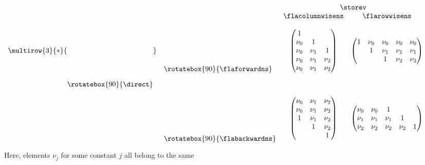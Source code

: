 \begin{flaspec}
{\begin{center}
\begin{math}
\begin{array}{clcc}
 & & \multicolumn{2}{c}{\storev}  \\
 & & \flacolumnwisens & \flarowwisens \\
& & & \\
\multirow{3}{*}{\raisebox{-16.5mm}{\rotatebox{90}{\direct}}}
&
\raisebox{-9.0mm}{\rotatebox{90}{\flaforwardns}}
& 
\begin{pmatrix}
1      &         &         \\
\nu_0  &  1      &         \\
\nu_0  &  \nu_1  &  1      \\
\nu_0  &  \nu_1  &  \nu_2  \\
\nu_0  &  \nu_1  &  \nu_2
\end{pmatrix}
&
\begin{pmatrix}
1    &  \nu_0  &  \nu_0  &  \nu_0  &  \nu_0  \\
     &  1      &  \nu_1  &  \nu_1  &  \nu_1  \\
     &         &  1      &  \nu_2  &  \nu_2
\end{pmatrix}
\\
 & & & \\
&
\raisebox{-10.0mm}{\rotatebox{90}{\flabackwardns}}
&
\begin{pmatrix}
\nu_0  &  \nu_1  &  \nu_2  \\
\nu_0  &  \nu_1  &  \nu_2  \\
1      &  \nu_1  &  \nu_2  \\
       &  1      &  \nu_2  \\
       &         &  1
\end{pmatrix}
&
\begin{pmatrix}
\nu_0  &  \nu_0  &  1      &         &     \\
\nu_1  &  \nu_1  &  \nu_1  &  1      &     \\
\nu_2  &  \nu_2  &  \nu_2  &  \nu_2  &  1
\end{pmatrix}
\\
\end{array}
\end{math}
\end{center}
Here, elements $ \nu_j $ for some constant $ j $ all belong to the same
}
\end{flaspec}
